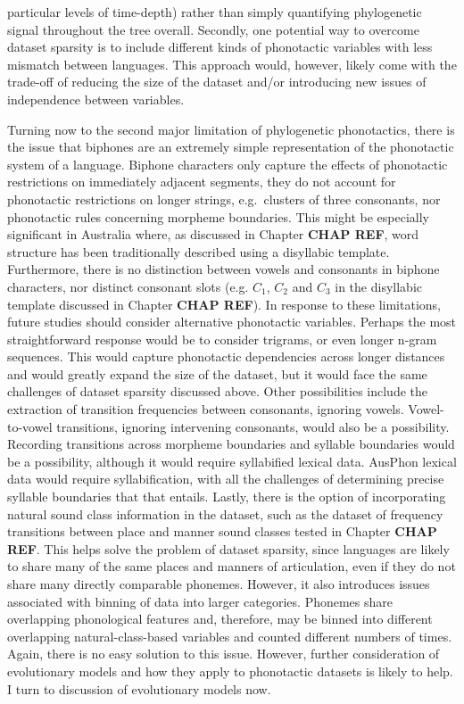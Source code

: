 particular levels of time-depth) rather than simply quantifying phylogenetic signal throughout the tree overall. Secondly, one potential way to overcome dataset sparsity is to include different kinds of phonotactic variables with less mismatch between languages. This approach would, however, likely come with the trade-off of reducing the size of the dataset and/or introducing new issues of independence between variables.

Turning now to the second major limitation of phylogenetic phonotactics, there is the issue that biphones are an extremely simple representation of the phonotactic system of a language. Biphone characters only capture the effects of phonotactic restrictions on immediately adjacent segments, they do not account for phonotactic restrictions on longer strings, e.g.~clusters of three consonants, nor phonotactic rules concerning morpheme boundaries. This might be especially significant in Australia where, as discussed in Chapter \textbf{CHAP REF}, word structure has been traditionally described using a disyllabic template. Furthermore, there is no distinction between vowels and consonants in biphone characters, nor distinct consonant slots (e.g. \(C_1\), \(C_2\) and \(C_3\) in the disyllabic template discussed in Chapter \textbf{CHAP REF}). In response to these limitations, future studies should consider alternative phonotactic variables. Perhaps the most straightforward response would be to consider trigrams, or even longer n-gram sequences. This would capture phonotactic dependencies across longer distances and would greatly expand the size of the dataset, but it would face the same challenges of dataset sparsity discussed above. Other possibilities include the extraction of transition frequencies between consonants, ignoring vowels. Vowel-to-vowel transitions, ignoring intervening consonants, would also be a possibility. Recording transitions across morpheme boundaries and syllable boundaries would be a possibility, although it would require syllabified lexical data. AusPhon lexical data would require syllabification, with all the challenges of determining precise syllable boundaries that that entails. Lastly, there is the option of incorporating natural sound class information in the dataset, such as the dataset of frequency transitions between place and manner sound classes tested in Chapter \textbf{CHAP REF}. This helps solve the problem of dataset sparsity, since languages are likely to share many of the same places and manners of articulation, even if they do not share many directly comparable phonemes. However, it also introduces issues associated with binning of data into larger categories. Phonemes share overlapping phonological features and, therefore, may be binned into different overlapping natural-class-based variables and counted different numbers of times. Again, there is no easy solution to this issue. However, further consideration of evolutionary models and how they apply to phonotactic datasets is likely to help. I turn to discussion of evolutionary models now.

